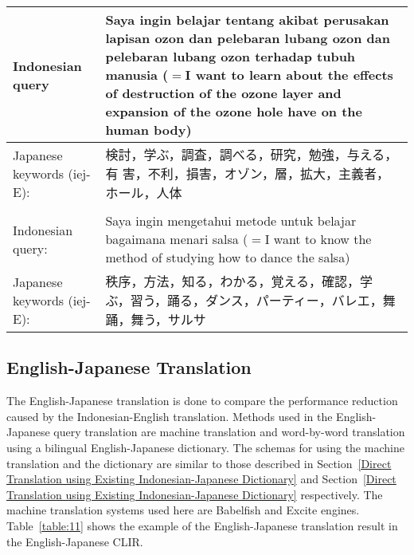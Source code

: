 \documentclass[english]{jnlp_1.3c}
\begin{document}
\begin{table}[b]
  \label{table:10}
   \begin{center}
    \begin{tabular}{|l|l|}\hline
     \multicolumn{1}{|p{10em}|}{Indonesian query}
     &    \multicolumn{1}{|p{30em}|}{Saya ingin belajar tentang akibat
     perusakan lapisan ozon dan pelebaran lubang ozon dan pelebaran
     lubang ozon terhadap tubuh manusia ($=$I want to learn about the
     effects of destruction of the ozone layer and expansion of the ozone
     hole have on the human body)}   \\  \hline
      \multicolumn{1}{|p{10em}|}{Japanese keywords (iej-E):}
     &    \multicolumn{1}{|p{30em}|}{検討，学ぶ，調査，調べる，研究，勉強，与える，有
     害，不利，損害，オゾン，層，拡大，主義者，ホール，人体}   \\  \hline
     \multicolumn{2}{|l|}{} \\ \hline
     \multicolumn{1}{|p{10em}|}{Indonesian query:}
     &    \multicolumn{1}{|p{30em}|}{Saya ingin mengetahui metode untuk
     belajar bagaimana menari salsa ($=$I want to know the method of
     studying how to dance the salsa)}   \\  \hline
       \multicolumn{1}{|p{10em}|}{Japanese keywords (iej-E):}
     &    \multicolumn{1}{|p{30em}|}{秩序，方法，知る，わかる，覚える，確認，学
     ぶ，習う，踊る，ダンス，パーティー，バレエ，舞踊，舞う，サルサ}   \\  \hline
    \end{tabular}
   \end{center}
\end{table}


\subsection{English-Japanese Translation}
\label{English-Japanese Translation} The English-Japanese translation is
done to compare the performance reduction caused by the
Indonesian-English translation. Methods used in the English-Japanese
query translation are machine translation and word-by-word translation
using a bilingual English-Japanese dictionary. The schemas for using the
machine translation and the dictionary are similar to those described in
Section~\ref{Direct Translation using Existing Indonesian-Japanese
Dictionary} and Section~\ref{Direct Translation using Existing
Indonesian-Japanese Dictionary} respectively. The machine translation
systems used here are Babelfish and Excite engines. Table~\ref{table:11}
shows the example of the English-Japanese translation result in the
English-Japanese CLIR.
\end{document}
